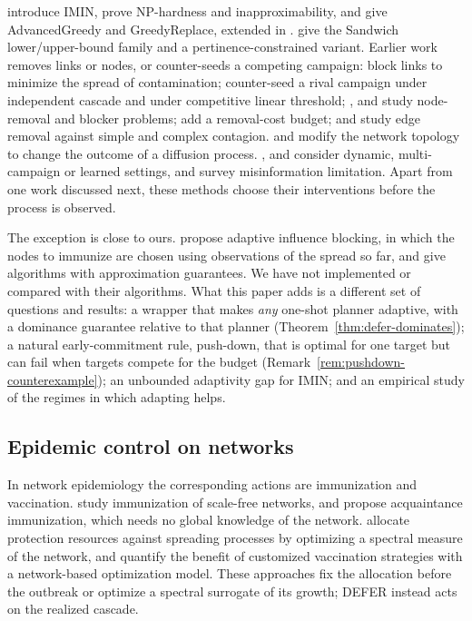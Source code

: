\documentclass[preprint,11pt]{elsarticle}
\theoremstyle{definition}
\theoremstyle{remark}
\begin{document}
\citet{xie2023} introduce IMIN, prove NP-hardness and inapproximability, and give AdvancedGreedy and GreedyReplace, extended in \citet{xie2024}. \citet{wang2024sandwich} give the Sandwich lower/upper-bound family and \citet{xiang2024} a pertinence-constrained variant. Earlier work removes links or nodes, or counter-seeds a competing campaign: \citet{kimura2008} block links to minimize the spread of contamination; \citet{budak2011} counter-seed a rival campaign under independent cascade and \citet{he2012} under competitive linear threshold; \citet{nguyen2012}, \citet{wang2013blocking} and \citet{yan2020} study node-removal and blocker problems; \citet{fan2013} add a removal-cost budget; and \citet{kuhlman2013} study edge removal against simple and complex contagion. \citet{tong2012} and \citet{khalil2014} modify the network topology to change the outcome of a diffusion process. \citet{wang2016drimux}, \citet{tong2018} and \citet{farajtabar2017} consider dynamic, multi-campaign or learned settings, and \citet{zareie2021} survey misinformation limitation. Apart from one work discussed next, these methods choose their interventions before the process is observed.

The exception is close to ours. \citet{shi2019} propose adaptive influence blocking, in which the nodes to immunize are chosen using observations of the spread so far, and give algorithms with approximation guarantees. We have not implemented or compared with their algorithms. What this paper adds is a different set of questions and results: a wrapper that makes \emph{any} one-shot planner adaptive, with a dominance guarantee relative to that planner (Theorem~\ref{thm:defer-dominates}); a natural early-commitment rule, push-down, that is optimal for one target but can fail when targets compete for the budget (Remark~\ref{rem:pushdown-counterexample}); an unbounded adaptivity gap for IMIN; and an empirical study of the regimes in which adapting helps.

\subsection{Epidemic control on networks}

In network epidemiology the corresponding actions are immunization and vaccination. \citet{pastor2002} study immunization of scale-free networks, and \citet{cohen2003} propose acquaintance immunization, which needs no global knowledge of the network. \citet{preciado2014} allocate protection resources against spreading processes by optimizing a spectral measure of the network, and \citet{li2024} quantify the benefit of customized vaccination strategies with a network-based optimization model. These approaches fix the allocation before the outbreak or optimize a spectral surrogate of its growth; DEFER instead acts on the realized cascade.
\end{document}
